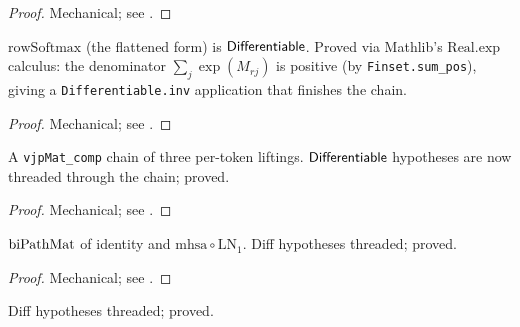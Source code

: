 \begin{proof}
\leanok
Mechanical; see .
\end{proof}

\begin{theorem}
  \label{ax:rowSoftmax_flat_diff}
  \leanok
  \(\mathrm{rowSoftmax}\) (the flattened form) is \(\mathsf{Differentiable}\).
  Proved via Mathlib's \(\mathrm{Real.exp}\) calculus: the denominator
  \(\sum_j \exp(M_{rj})\) is positive (by \texttt{Finset.sum\_pos}),
  giving a \texttt{Differentiable.inv} application that finishes the
  chain.
\end{theorem}

\begin{proof}
\leanok
Mechanical; see .
\end{proof}

\begin{theorem}
  \label{thm:transformerMlp_has_vjp_mat}
  \leanok
  A \texttt{vjpMat\_comp} chain of three per-token liftings.
  \(\mathsf{Differentiable}\) hypotheses are now threaded through the chain;
  proved.
\end{theorem}

\begin{proof}
\leanok
Mechanical; see .
\end{proof}

\begin{theorem}
  \label{thm:transformerAttnSublayer_has_vjp_mat}
  \leanok
  \(\operatorname{biPathMat}\) of identity and \(\mathrm{mhsa} \circ \mathrm{LN_1}\).
  Diff hypotheses threaded; proved.
\end{theorem}

\begin{proof}
\leanok
Mechanical; see .
\end{proof}

\begin{theorem}
  \label{thm:transformerMlpSublayer_has_vjp_mat}
  \leanok
  Diff hypotheses threaded; proved.
\end{theorem}


